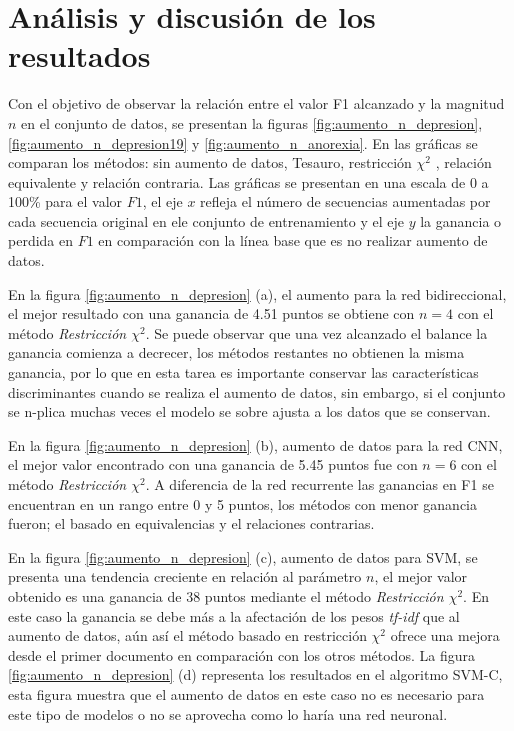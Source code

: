 \section{Análisis y discusión de los resultados}

Con el objetivo de observar la relación entre el valor F1 alcanzado y la magnitud $n$ en el conjunto de datos, se presentan la figuras \ref{fig:aumento_n_depresion}, \ref{fig:aumento_n_depresion19} y \ref{fig:aumento_n_anorexia}. En las gráficas se comparan los métodos: sin aumento de datos, Tesauro, restricción $\chi^2$ , relación equivalente y relación contraria. Las gráficas se presentan en una escala de 0 a 100\% para el valor $F1$, el eje $x$ refleja el número de secuencias aumentadas por cada secuencia original en ele conjunto de entrenamiento y el eje $y$ la ganancia o perdida en $F1$ en comparación con la línea base que es no realizar aumento de datos. 

En la figura \ref{fig:aumento_n_depresion} (a), el aumento para la red bidireccional, el mejor resultado con una ganancia de 4.51 puntos se obtiene con $n=4$ con el método \textit{Restricción $\chi^2$}. Se puede observar que una vez alcanzado el balance la ganancia comienza a decrecer, los métodos restantes no obtienen la misma ganancia, por lo que en esta tarea es importante conservar las características discriminantes cuando se realiza el aumento de datos, sin embargo, si el conjunto se n-plica muchas veces el modelo se sobre ajusta a los datos que se conservan.

En la figura \ref{fig:aumento_n_depresion} (b), aumento de datos para la red CNN, el mejor valor encontrado con una ganancia de 5.45 puntos fue con $n=6$ con el método \textit{Restricción $\chi^2$}. A diferencia de la red recurrente las ganancias en F1 se encuentran en un rango entre 0 y 5 puntos, los métodos con menor ganancia fueron; el basado en equivalencias y el relaciones contrarias.

En la figura \ref{fig:aumento_n_depresion} (c), aumento de datos para SVM, se presenta una tendencia creciente en relación al parámetro $n$, el mejor valor obtenido es una ganancia de 38 puntos mediante el método \textit{Restricción $\chi^2$}. En este caso la ganancia se debe más a la afectación de los pesos \textit{tf-idf} que al aumento de datos, aún así el método basado en restricción $\chi^2$ ofrece una mejora desde el primer documento en comparación con los otros métodos. La figura \ref{fig:aumento_n_depresion} (d) representa los resultados en el algoritmo SVM-C, esta figura muestra que el aumento de datos en este caso no es necesario para este tipo de modelos o no se aprovecha como lo haría una red neuronal.

